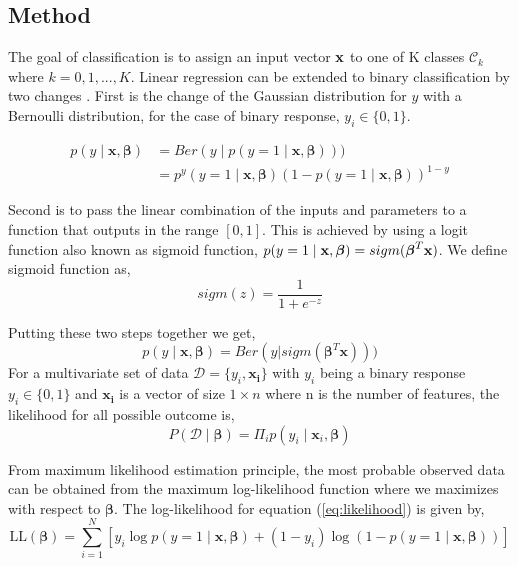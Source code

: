 \subsection{Method} \label{subsec:method_logistic_regression}

The goal of classification is to assign an input vector $\bold{x}$ to one of K classes $\mathcal{C}_k$ where $k=0,1,...,K$. Linear regression can be extended to binary classification by two changes \cite{murphy_machine_2012}. First is the change of the Gaussian distribution for $y$ with a Bernoulli distribution, for the case of binary response, $y_i \in \{0,1\}$. 

\begin{align}
     p(y \mid \mathbf{x}, \boldsymbol{\beta})&=Ber(y \mid p(y=1\mid \boldsymbol{x},\boldsymbol{\beta}))) \\
        &= p^{y}\left(y=1\mid  \mathbf{x}, \boldsymbol{\beta} \right)\left(1-p(y=1\mid  \mathbf{x}, \boldsymbol{\beta} )\right)^{1-y}
\end{align}

Second is to pass the linear combination of the inputs and parameters to a function that outputs in the range $[0,1]$. This is achieved by using a logit function also known as sigmoid function, $p(y=1\mid \bold{x}, \boldsymbol{\beta}) = sigm(\boldsymbol{\beta}^T \bold{x})$. 
\newline\newline
We define sigmoid function as,
\begin{equation}
    sigm(z ) = \frac{1}{1 + e^{-z}}
\end{equation}


Putting these two steps together we get,
\begin{equation}
    p(y \mid \mathbf{x}, \boldsymbol{\beta})=Ber(y|sigm(\boldsymbol{\beta}^T \mathbf{x})))
\end{equation}
For a multivariate set of data $\mathcal{D} = \{y_i, \mathbf{x_i}\}$ with $y_i$ being a binary response $y_i \in \{0,1\}$ and $\mathbf{x_i}$ is a vector of size $1\times n$ where n is the number of features, the likelihood for all possible outcome is, 
\begin{equation}\label{eq:likelihood}
    P(\mathcal{D}\mid \boldsymbol{\beta}) =  \Pi_i p(y_i \mid \mathbf{x}_i, \boldsymbol{\beta})
\end{equation}

From maximum likelihood estimation principle, the most probable observed data can be obtained from the maximum log-likelihood function where we maximizes with respect to $\boldsymbol\beta$. The log-likelihood for equation (\ref{eq:likelihood}) is given by,
\begin{equation}
  \mathrm{LL}(\boldsymbol{\beta}) =\sum_{i=1}^{N}\left[y_{i} \log p(y=1\mid  \mathbf{x}, \boldsymbol{\beta} )+\left(1-y_{i}\right) \log \left(1-p(y=1\mid  \mathbf{x}, \boldsymbol{\beta} )\right)\right]
\end{equation}

